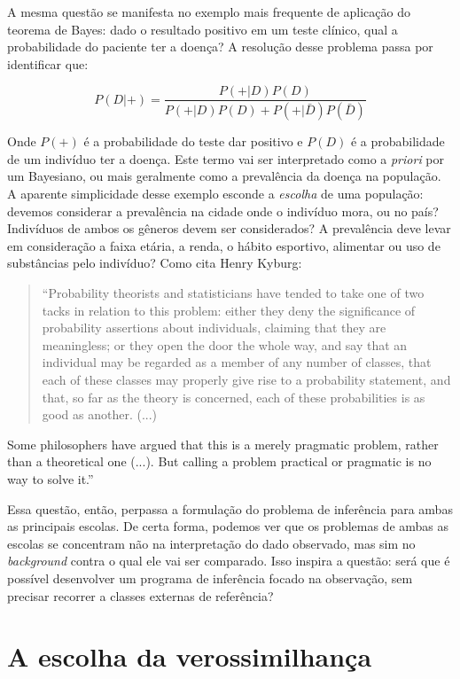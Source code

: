 A mesma questão se manifesta no exemplo mais frequente de aplicação do teorema de Bayes: dado o resultado positivo em um
teste clínico, qual a probabilidade do paciente ter a doença? A resolução desse problema passa por identificar que:

\begin{equation}
P(D|+) = \frac{P(+|D)P(D)}{P(+|D)P(D)+P(+|\bar D) P(\bar D)}
\end{equation}

Onde $P(+)$ é a probabilidade do teste dar positivo 
e $P(D)$ é a probabilidade de um
indivíduo ter a doença. Este termo vai ser interpretado como a {\em priori} por um Bayesiano, ou mais geralmente
como a prevalência da doença na população. A aparente simplicidade desse exemplo esconde a {\em escolha} de uma população:
devemos considerar a prevalência na cidade onde o indivíduo mora, ou no país? Indivíduos de ambos os gêneros devem ser
considerados? A prevalência deve levar em consideração a faixa etária, a renda, o hábito esportivo, alimentar ou uso de
substâncias pelo indivíduo? Como cita Henry Kyburg:

\begin{quote}
``Probability theorists and statisticians have tended to take one of two tacks in relation to this problem:
either they deny the significance of probability assertions about individuals, claiming that they are meaningless;
or they open the door the whole way, and say that an individual may be regarded as a member of any number of classes, 
that each of these classes may properly give rise to a probability statement, and that, so far as the theory is concerned,
each of these probabilities is as good as another. (...)
\end{quote}

Some philosophers have argued that this is a merely pragmatic problem, rather than a theoretical one (...). But calling
a problem practical or pragmatic is no way to solve it.'' \citep{Kyburg74}

Essa questão, então, perpassa a formulação do problema de inferência para ambas as principais escolas. De certa forma,
podemos ver que os problemas de ambas as escolas se concentram não na interpretação do dado observado, mas sim
no {\em background} contra o qual ele vai ser comparado. Isso inspira a questão: será que é possível desenvolver
um programa de inferência focado na observação, sem precisar recorrer a classes externas de referência?

\section{A escolha da verossimilhança}\label{sec:likelihood}


